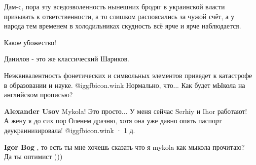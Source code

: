 \begin{itemize}
Дам-с, пора эту вседозволенность нынешних бродяг в украинской власти призывать
к ответственности, а то слишком распоясались за чужой счёт, а у народа тем
временем в холодильниках скудность всё ярче и ярче наблюдается.

 
Какое убожество!

 
Данилов - это же классический Шариков.

 

Неэквивалентность фонетических и символьных элементов приведет к катастрофе в
образовании и науке.  @igg{fbicon.wink}  Нормально, что... Как будет мЫкола на английском
прописью?

\begin{itemize} %
 
\textbf{Alexander Usov} Mykola! Это просто... У меня сейчас Serhiy и Ihor
работают! А жену я до сих пор Оленем дразню, хотя она уже давно опять паспорт
деукраинизировала!  @igg{fbicon.wink}  · 1 д.
 
\textbf{Igor Bog} , то есть ты мне хочешь сказать что я mykola как мыкола прочитаю? Да ты оптимист )))

 

\end{itemize}
\end{itemize}
